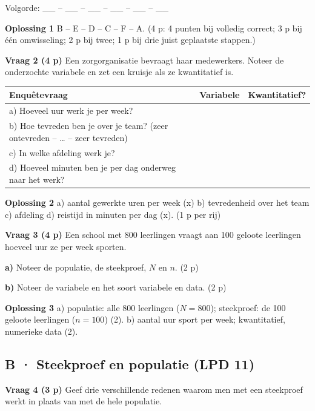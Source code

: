 Volgorde: \_\_ – \_\_ – \_\_ – \_\_ – \_\_ – \_\_

\begin{oplossing}
\textbf{Oplossing 1} \quad B – E – D – C – F – A. (4 p: 4 punten bij volledig correct; 3 p bij één omwisseling; 2 p bij twee; 1 p bij drie juist geplaatste stappen.)
\end{oplossing}

\textbf{Vraag 2 \quad (4 p)} Een zorgorganisatie bevraagt haar medewerkers. Noteer de onderzochte variabele en zet een kruisje als ze kwantitatief is.

\begin{tabular}{lll}
\hline
Enquêtevraag & Variabele & Kwantitatief? \\
\hline
a) Hoeveel uur werk je per week? & & \\
b) Hoe tevreden ben je over je team? (zeer ontevreden – … – zeer tevreden) & & \\
c) In welke afdeling werk je? & & \\
d) Hoeveel minuten ben je per dag onderweg naar het werk? & & \\
\hline
\end{tabular}

\begin{oplossing}
\textbf{Oplossing 2} \quad a) aantal gewerkte uren per week (x) b) tevredenheid over het team c) afdeling d) reistijd in minuten per dag (x). (1 p per rij)
\end{oplossing}

\textbf{Vraag 3 \quad (4 p)} Een school met 800 leerlingen vraagt aan 100 geloote leerlingen hoeveel uur ze per week sporten.

\textbf{a)} Noteer de populatie, de steekproef, $N$ en $n$. (2 p) \lijn

\textbf{b)} Noteer de variabele en het soort variabele en data. (2 p) \lijn

\begin{oplossing}
\textbf{Oplossing 3} \quad a) populatie: alle 800 leerlingen ($N=800$); steekproef: de 100 geloote leerlingen ($n=100$) (2). b) aantal uur sport per week; kwantitatief, numerieke data (2).
\end{oplossing}

\subsection*{B · Steekproef en populatie (LPD 11)}

\textbf{Vraag 4 \quad (3 p)} Geef drie verschillende redenen waarom men met een steekproef werkt in plaats van met de hele populatie. \lijn

